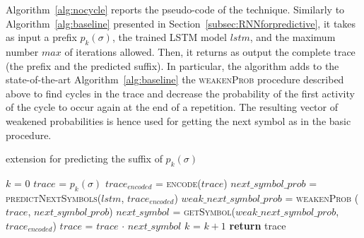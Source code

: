 Algorithm~\ref{alg:nocycle} reports the pseudo-code of the \nocycle technique. Similarly to Algorithm~\ref{alg:baseline} presented in Section~\ref{subsec:RNNforpredictive}, it takes as input a prefix $p_k(\sigma)$,  the trained LSTM model $lstm$, and the maximum number $max$ of iterations allowed. Then, it returns as output the complete trace (the prefix and the predicted suffix).  In particular, the algorithm adds to the state-of-the-art Algorithm~\ref{alg:baseline} the \textsc{weakenProb} procedure described above to find cycles in the trace and decrease the probability of the first activity of the cycle to occur again at the end of a repetition. The resulting vector of weakened probabilities is hence used for getting the next symbol as in the basic procedure.

\begin{algorithm}
	\caption{\nocycle extension for predicting the suffix of $p_k(\sigma)$}
	\begin{algorithmic}[1]
		\State $k$ = 0
		\State $trace$ = $p_k(\sigma)$
		\Do
		\State $trace_{encoded}$ = \textsc{encode}($trace$)
		\State $next\_symbol\_prob$ = \textsc{predictNextSymbols}($lstm$, $trace_{encoded}$)
		\State $weak\_next\_symbol\_prob$ = \textsc{weakenProb} ($trace$, $next\_symbol\_prob$)
		\State $next\_symbol$ = \textsc{getSymbol}($weak\_next\_symbol\_prob$, $trace_{encoded}$)
		\State $trace$ = $trace$ $\cdot$ $next\_symbol$
		\State $k$ = $k + 1$
		\State \textbf{return} trace
		\EndFunction
		

	\end{algorithmic}
	\label{alg:nocycle}
\end{algorithm}


